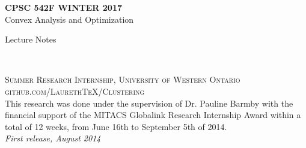 \documentclass[11pt,fleqn]{book} %
\begin{document}

\begingroup
\thispagestyle{empty}
\centering
\vspace*{5cm}
\par\normalfont\fontsize{35}{35}\sffamily\selectfont
\textbf{CPSC 542F WINTER 2017}\\
{\LARGE Convex Analysis and Optimization}\par %
\vspace*{1cm}
{\Huge Lecture Notes}\par %
\endgroup


\newpage
~\vfill
\thispagestyle{empty}


\noindent \textsc{Summer Research Internship, University of Western Ontario}\\

\noindent \textsc{github.com/LaurethTeX/Clustering}\\ %

\noindent This research was done under the supervision of Dr. Pauline Barmby with the financial support of the MITACS Globalink Research Internship Award within a total of 12 weeks, from June 16th to September 5th of 2014.\\ %

\noindent \textit{First release, August 2014} %



\pagestyle{empty} %

\tableofcontents %


\pagestyle{fancy} %

%



%
%
%


%

\end{document}
